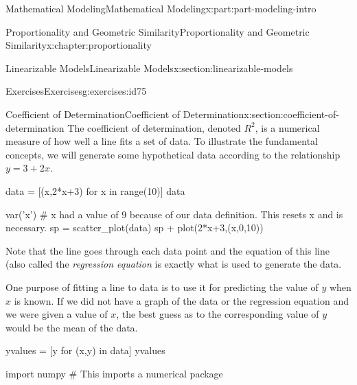 \documentclass[oneside,10pt,]{book}
\numberwithin{equation}{section}
\begin{document}
\begin{partptx}{Mathematical Modeling}{}{Mathematical Modeling}{}{}{x:part:part-modeling-intro}
\begin{chapterptx}{Proportionality and Geometric Similarity}{}{Proportionality and Geometric Similarity}{}{}{x:chapter:proportionality}
\begin{sectionptx}{Linearizable Models}{}{Linearizable Models}{}{}{x:section:linearizable-models}
\begin{exercises-subsection}{Exercises}{}{Exercises}{}{}{g:exercises:id75}
\end{exercises-subsection}
\end{sectionptx}
%
%
\typeout{************************************************}
\typeout{************************************************}
%
\begin{sectionptx}{Coefficient of Determination}{}{Coefficient of Determination}{}{}{x:section:coefficient-of-determination}
The coefficient of determination, denoted \(R^2\), is a numerical measure of how well a line fits a set of data.  To illustrate the fundamental concepts, we will generate some hypothetical data according to the relationship \(y=3+2x\).%
\begin{sageinput}
data = [(x,2*x+3) for x in range(10)]
data
\end{sageinput}
\begin{sageoutput}
[(0, 3),
 (1, 5),
 (2, 7),
 (3, 9),
 (4, 11),
 (5, 13),
 (6, 15),
 (7, 17),
 (8, 19),
 (9, 21)]
\end{sageoutput}
\begin{sageinput}
var('x') # x had a value of 9 because of our data definition.  This resets x and is necessary.
sp = scatter_plot(data)
sp + plot(2*x+3,(x,0,10))
\end{sageinput}
Note that the line goes through each data point and the equation of this line (also called the \emph{regression equation} is exactly what is used to generate the data.%
\par
One purpose of fitting a line to data is to use it for predicting the value of \(y\) when \(x\) is known.  If we did not have a graph of the data or the regression equation and we were given a value of \(x\), the best guess as to the corresponding value of \(y\) would be the mean of the data.%
\begin{sageinput}
yvalues = [y for (x,y) in data]
yvalues
\end{sageinput}
\begin{sageoutput}
[3, 5, 7, 9, 11, 13, 15, 17, 19, 21]
\end{sageoutput}
\begin{sageinput}
import numpy # This imports a numerical package


\end{sageinput}
\end{sectionptx}
\end{chapterptx}
\end{partptx}
\end{document}
